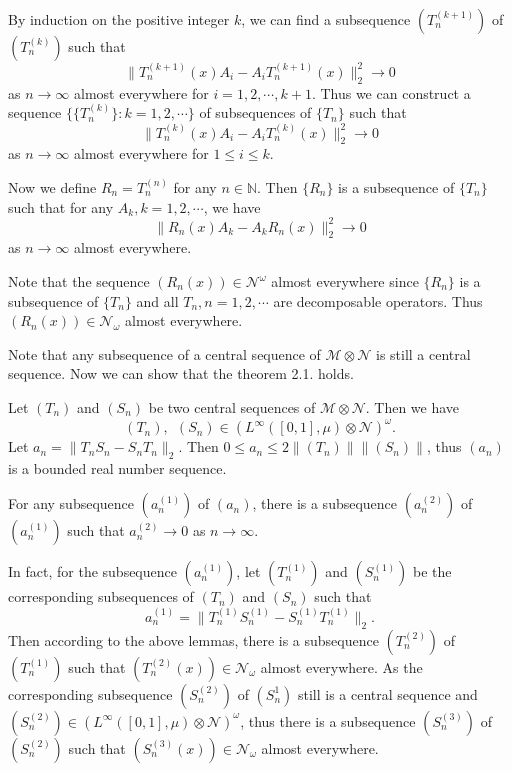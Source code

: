 \documentclass[12pt]{article}
\begin{document}
By induction on the positive integer $k$, we can find a subsequence
$(T_{n}^{(k+1)})$ of $(T_{n}^{(k)})$ such that
$$\|T_{n}^{(k+1)}(x)A_{i}-A_{i}T_{n}^{(k+1)}(x)\|^{2}_{2}\rightarrow0$$
as $n\rightarrow\infty$ almost everywhere for $i=1,2,\cdots,k+1$. Thus we can construct a sequence $\{\{T_{n}^{(k)}\}:k=1,2,\cdots\}$
of subsequences of $\{T_{n}\}$
such that
$$\|T_{n}^{(k)}(x)A_{i}-A_{i}T_{n}^{(k)}(x)\|^{2}_{2}\rightarrow0$$
as $n\rightarrow\infty$ almost everywhere for $1\leq i\leq k$.

Now we define $R_{n}=T_{n}^{(n)}$ for any $n\in\mathbb{N}$. Then $\{R_{n}\}$ is a subsequence of
$\{T_{n}\}$ such that for any $A_{k},k=1,2,\cdots$, we have
$$\|R_{n}(x)A_{k}-A_{k}R_{n}(x)\|^{2}_{2}\rightarrow0$$
as $n\rightarrow\infty$ almost everywhere.

Note that the sequence $(R_{n}(x))\in\mathcal{N}^{\omega}$ almost everywhere since $\{R_{n}\}$ is a subsequence of $\{T_{n}\}$ and all
$T_{n},n=1,2,\cdots$ are decomposable operators. Thus $(R_{n}(x))\in\mathcal{N}_{\omega}$ almost everywhere.
\endproof

Note that any subsequence of a central sequence of
$\mathcal{M}\otimes\mathcal{N}$ is still a central sequence. Now we
can show that the theorem 2.1. holds. \vskip6pt



 Let $(T_{n})$ and $(S_{n})$ be
two central sequences of $\mathcal{M}\otimes\mathcal{N}$. Then we
have
$$(T_{n}),\  \ (S_{n})\in(L^{\infty}([0,1],\mu)\otimes\mathcal{N})^{\omega}.$$
Let $a_{n}=\|T_{n}S_{n}-S_{n}T_{n}\|_{2}$. Then $0\leq a_{n}\leq
2\|(T_{n})\|\|(S_{n})\|$, thus $(a_{n})$ is a bounded real number
sequence. \vskip4pt

 For any subsequence $(a_{n}^{(1)})$ of
$(a_{n})$, there is a subsequence $(a_{n}^{(2)})$ of $(a_{n}^{(1)})$
such that $a_{n}^{(2)}\rightarrow0$ as $n\rightarrow\infty$.
 \vskip4pt

In fact, for the subsequence $(a_{n}^{(1)})$, let $(T_{n}^{(1)})$
and $(S_{n}^{(1)})$ be the corresponding subsequences of $(T_{n})$
and $(S_{n})$ such that
$$a_{n}^{(1)}=\|T_{n}^{(1)}S_{n}^{(1)}-S_{n}^{(1)}T_{n}^{(1)}\|_{2}.$$
Then according to the above lemmas, there is a subsequence
$(T_{n}^{(2)})$ of $(T_{n}^{(1)})$ such that
$(T_{n}^{(2)}(x))\in\mathcal{N}_{\omega}$ almost everywhere. As the
corresponding subsequence $(S_{n}^{(2)})$ of $(S_{n}^{1})$ still is
a central sequence and
$(S_{n}^{(2)})\in(L^{\infty}([0,1],\mu)\otimes\mathcal{N})^{\omega}$,
thus there is a subsequence $(S_{n}^{(3)})$ of $(S_{n}^{(2)})$ such
that $(S_{n}^{(3)}(x))\in\mathcal{N}_{\omega}$ almost everywhere.
\end{document}
